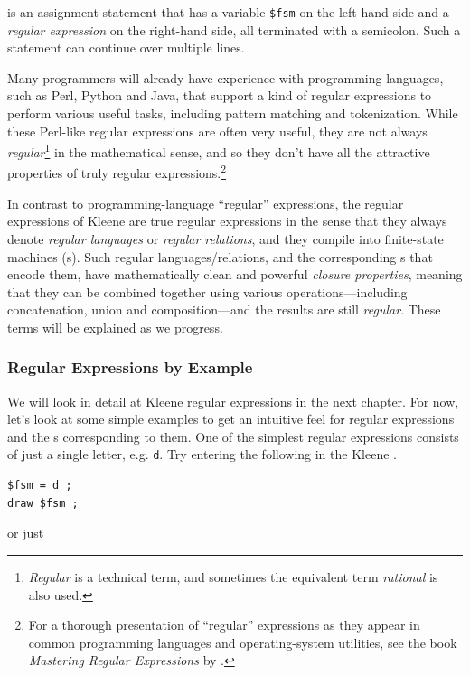\noindent
is an assignment statement that has a variable \verb!$fsm! on the left-hand side and a
\emph{regular expression} on the right-hand side, all terminated with a semicolon.  Such
a statement can continue over multiple lines.

Many programmers will already have experience with programming languages, such as Perl,
Python and Java, that support a kind of regular expressions to
perform various useful tasks, including pattern matching and tokenization.  While these
Perl-like regular expressions are often very useful, they are not always
\emph{regular}\footnote{\emph{Regular} is a technical term, and sometimes the equivalent term
\emph{rational} is also used.}
in the mathematical sense, and so they don't have all the attractive properties of truly
regular expressions.\footnote{For a thorough presentation of ``regular'' expressions as
they appear in common programming languages and operating-system utilities, see the book \emph{Mastering Regular Expressions} by
\citet{friedl:2006}.}

In contrast to programming-language ``regular'' expressions, the regular expressions of Kleene are true regular
expressions in the sense that they always
denote \emph{regular languages} or \emph{regular relations}, and they compile into
finite-state machines (\fsm{}s).  Such regular languages/relations, and the
corresponding \fsm{}s that encode them, have mathematically clean and powerful \emph{closure properties}, meaning
that they can be combined together using various operations---including concatenation,
union and composition---and the results are still \emph{regular}.  These terms will be explained as we progress.


\subsubsection{Regular Expressions by Example}

We will look in detail at Kleene regular expressions in the next chapter.  
For now, let's look at some simple examples to get an
intuitive feel for regular expressions and the \fsm{}s corresponding to them.  One of the simplest regular
expressions consists of just a single letter, e.g. \texttt{d}.  Try entering the
following in the Kleene .

\begin{Verbatim}
$fsm = d ;
draw $fsm ;
\end{Verbatim}

\noindent
or just

